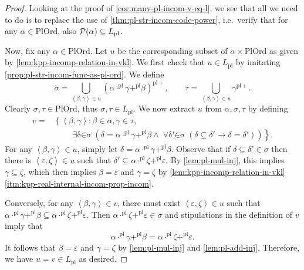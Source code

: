 \documentclass[12pt,openany]{book}
\theoremstyle{plain}
\theoremstyle{definition}
\newcommand\tuple[1]{\left\langle #1 \right\rangle}
\newcommand\opA[1]{\mathop{\forall #1}}
\newcommand\opE[1]{\mathop{\exists #1}}
\newcommand\Pow{\mathcal{P}}
\newcommand\PlOrd{\mathrm{PlOrd}}
\newcommand\pl{\mathrm{pl}}
\newcommand\pls{{\pl +}}
\begin{document}
\begin{proof}
  Looking at the proof of \autoref{cor:many-pl-incom-v-eq-l}, we see that all we need to do is to replace the use of \autoref{thm:pl-str-incom-code-power}, i.e.\ verify that for any $\alpha \in \PlOrd$, also $\Pow\mleft(\alpha\mright) \subseteq L_\pl$.

  Now, fix any $\alpha \in \PlOrd$. Let $u$ be the corresponding subset of $\alpha \times \PlOrd$ as given by \autoref{lem:kpp-incomp-relation-in-vkl}. We first check that $u \in L_\pl$ by imitating \autoref{prop:pl-str-incom-func-as-pl-ord}. We define
  \[\sigma = \bigcup_{\tuple{\beta, \gamma} \in u} \left(\alpha \cdot^\pl \gamma +^\pl \beta\right)^\pls, \qquad \tau = \bigcup_{\tuple{\beta, \gamma} \in u} \gamma^\pls.\]
  Clearly $\sigma, \tau \in \PlOrd$, thus $\sigma, \tau \in L_\pl$. We now extract $u$ from $\alpha, \sigma, \tau$ by defining
  \begin{align*}
    v = & \left\{\tuple{\beta, \gamma} : \beta \in \alpha, \gamma \in \tau, \right.                                                                                                                                 \\
        & \qquad \left.\opE{\delta \in \sigma} \left(\delta = \alpha \cdot^\pl \gamma +^\pl \beta \land \opA{\delta' \in \sigma} \left(\delta \subseteq \delta' \rightarrow \delta = \delta'\right)\right)\right\}.
  \end{align*}
  For any $\tuple{\beta, \gamma} \in u$, simply let $\delta = \alpha \cdot^\pl \gamma +^\pl \beta$. Observe that if $\delta \subseteq \delta' \in \sigma$ then there is $\tuple{\varepsilon, \zeta} \in u$ such that $\delta' \subseteq \alpha \cdot^\pl \zeta +^\pl \varepsilon$. By \autoref{lem:pl-mul-inj}, this implies $\gamma \subseteq \zeta$, which then implies $\beta = \varepsilon$ and $\gamma = \zeta$ by \autoref{lem:kpp-incomp-relation-in-vkl}\ref{itm:kpp-real-internal-incom-prop-incom}.

  Conversely, for any $\tuple{\beta, \gamma} \in v$, there must exist $\tuple{\varepsilon, \zeta} \in u$ such that $\alpha \cdot^\pl \gamma +^\pl \beta \subseteq \alpha \cdot^\pl \zeta +^\pl \varepsilon$. Then $\alpha \cdot^\pl \zeta +^\pl \varepsilon \in \sigma$ and stipulations in the definition of $v$ imply that
  \[\alpha \cdot^\pl \gamma +^\pl \beta = \alpha \cdot^\pl \zeta +^\pl \varepsilon.\]
  It follows that $\beta = \varepsilon$ and $\gamma = \zeta$ by \autoref{lem:pl-mul-inj} and \autoref{lem:pl-add-inj}. Therefore, we have $u = v \in L_\pl$ as desired.


\end{proof}
\end{document}
